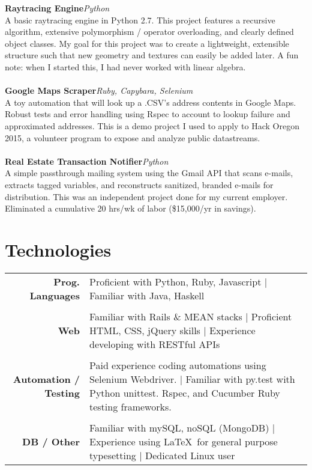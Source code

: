 \documentclass[11pt,line,centered]{res}
\begin{document}
\begin{resume}
    {\bfseries\footnotesize Raytracing Engine}\hfill \textit {Python}\\
        A basic raytracing engine in Python 2.7. This project features a recursive algorithm, extensive polymorphism
        / operator overloading, and clearly defined object classes. My goal for this project was to create a lightweight,
        extensible structure such that new geometry and textures can easily be added later. A fun note: when I
        started this, I had never worked with linear algebra.\\
    \\
    {\bfseries\footnotesize  Google Maps Scraper}\hfill \textit {Ruby, Capybara, Selenium}\\
        A toy automation that will look up a .CSV’s address contents in Google Maps. Robust tests and error
        handling using Rspec to account to lookup failure and approximated addresses. This is a demo project I
        used to apply to Hack Oregon 2015, a volunteer program to expose and analyze public datastreams.\\
    \\
    {\bfseries\footnotesize  Real Estate Transaction Notifier}\hfill \textit {Python}\\
        A simple passthrough mailing system using the Gmail API that scans e-mails, extracts tagged variables,
        and reconstructs sanitized, branded e-mails for distribution. This was an independent project done for my
        current employer. Eliminated a cumulative 20 hrs/wk of labor (\$15,000/yr in savings).\\

\section{\sectionfont\normalsize Technologies}
    \vspace{1em}

    \begin{tabulary}{\textwidth}{RJ}
        {\bfseries\footnotesize Prog. Languages} & Proficient with Python, Ruby, Javascript | Familiar with Java, Haskell\\
        \\

        {\bfseries\footnotesize Web} & Familiar with Rails \& MEAN stacks | Proficient HTML, CSS, jQuery skills | Experience developing with RESTful APIs\\
        \\

        {\bfseries\footnotesize Automation / Testing} & Paid experience coding automations using Selenium Webdriver. | Familiar with py.test with Python unittest. Rspec, and Cucumber Ruby testing frameworks.\\
        \\

        {\bfseries\footnotesize DB / Other} & Familiar with mySQL, noSQL (MongoDB) | Experience using \LaTeX\ for general purpose typesetting | Dedicated Linux user\\

    \end{tabulary}

\end{resume}
\end{document}

